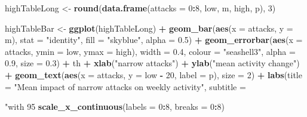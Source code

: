 \documentclass[10pt,]{scrartcl}
\newenvironment{Shaded}{\begin{snugshade}}{\end{snugshade}}
\newcommand{\KeywordTok}[1]{\textcolor[rgb]{0.13,0.29,0.53}{\textbf{#1}}}
\newcommand{\DataTypeTok}[1]{\textcolor[rgb]{0.13,0.29,0.53}{#1}}
\newcommand{\DecValTok}[1]{\textcolor[rgb]{0.00,0.00,0.81}{#1}}
\newcommand{\FloatTok}[1]{\textcolor[rgb]{0.00,0.00,0.81}{#1}}
\newcommand{\StringTok}[1]{\textcolor[rgb]{0.31,0.60,0.02}{#1}}
\newcommand{\OperatorTok}[1]{\textcolor[rgb]{0.81,0.36,0.00}{\textbf{#1}}}
\newcommand{\NormalTok}[1]{#1}
\begin{document}
\begin{Shaded}
\begin{Highlighting}[]
\NormalTok{highTableLong <-}\StringTok{ }\KeywordTok{round}\NormalTok{(}\KeywordTok{data.frame}\NormalTok{(}\DataTypeTok{attacks =} \DecValTok{0}\OperatorTok{:}\DecValTok{8}\NormalTok{, low, m, high,}
\NormalTok{    p), }\DecValTok{3}\NormalTok{)}

\NormalTok{highTableBar <-}\StringTok{ }\KeywordTok{ggplot}\NormalTok{(highTableLong) }\OperatorTok{+}\StringTok{ }\KeywordTok{geom_bar}\NormalTok{(}\KeywordTok{aes}\NormalTok{(}\DataTypeTok{x =}\NormalTok{ attacks,}
    \DataTypeTok{y =}\NormalTok{ m), }\DataTypeTok{stat =} \StringTok{"identity"}\NormalTok{, }\DataTypeTok{fill =} \StringTok{"skyblue"}\NormalTok{, }\DataTypeTok{alpha =} \FloatTok{0.5}\NormalTok{) }\OperatorTok{+}
\StringTok{    }\KeywordTok{geom_errorbar}\NormalTok{(}\KeywordTok{aes}\NormalTok{(}\DataTypeTok{x =}\NormalTok{ attacks, }\DataTypeTok{ymin =}\NormalTok{ low, }\DataTypeTok{ymax =}\NormalTok{ high),}
        \DataTypeTok{width =} \FloatTok{0.4}\NormalTok{, }\DataTypeTok{colour =} \StringTok{"seashell3"}\NormalTok{, }\DataTypeTok{alpha =} \FloatTok{0.9}\NormalTok{, }\DataTypeTok{size =} \FloatTok{0.3}\NormalTok{) }\OperatorTok{+}
\StringTok{    }\NormalTok{th }\OperatorTok{+}\StringTok{ }\KeywordTok{xlab}\NormalTok{(}\StringTok{"narrow attacks"}\NormalTok{) }\OperatorTok{+}\StringTok{ }\KeywordTok{ylab}\NormalTok{(}\StringTok{"mean activity change"}\NormalTok{) }\OperatorTok{+}
\StringTok{    }\KeywordTok{geom_text}\NormalTok{(}\KeywordTok{aes}\NormalTok{(}\DataTypeTok{x =}\NormalTok{ attacks, }\DataTypeTok{y =}\NormalTok{ low }\OperatorTok{-}\StringTok{ }\DecValTok{20}\NormalTok{, }\DataTypeTok{label =}\NormalTok{ p), }\DataTypeTok{size =} \DecValTok{2}\NormalTok{) }\OperatorTok{+}
\StringTok{    }\KeywordTok{labs}\NormalTok{(}\DataTypeTok{title =} \StringTok{"Mean impact of narrow attacks on  weekly activity"}\NormalTok{,}
        \DataTypeTok{subtitle =} \StringTok{"with 95%
\StringTok{    }\KeywordTok{scale_x_continuous}\NormalTok{(}\DataTypeTok{labels =} \DecValTok{0}\OperatorTok{:}\DecValTok{8}\NormalTok{, }\DataTypeTok{breaks =} \DecValTok{0}\OperatorTok{:}\DecValTok{8}\NormalTok{)}

}
\end{Highlighting}
\end{Shaded}
\end{document}
